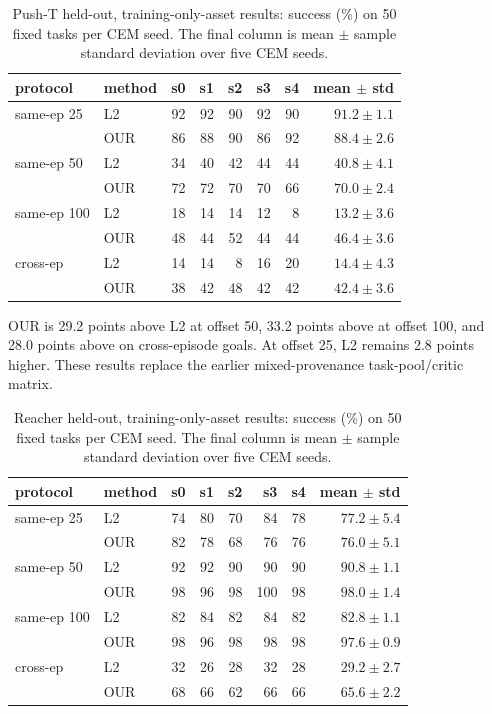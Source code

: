 \documentclass[11pt]{article}
\begin{document}
\begin{table}[t]
\centering
\small
\caption{Push-T held-out, training-only-asset results: success (\%) on 50 fixed tasks per
CEM seed.  The final column is mean $\pm$ sample standard deviation over five CEM seeds.}
\label{tab:task-critic-refresh}
\begin{tabular}{llrrrrrr}
\toprule
protocol & method & s0 & s1 & s2 & s3 & s4 & mean $\pm$ std \\
\midrule
same-ep 25 & L2 & 92 & 92 & 90 & 92 & 90 & $91.2 \pm 1.1$ \\
           & OUR & 86 & 88 & 90 & 86 & 92 & $88.4 \pm 2.6$ \\
\midrule
same-ep 50 & L2 & 34 & 40 & 42 & 44 & 44 & $40.8 \pm 4.1$ \\
           & OUR & 72 & 72 & 70 & 70 & 66 & $70.0 \pm 2.4$ \\
\midrule
same-ep 100 & L2 & 18 & 14 & 14 & 12 & 8 & $13.2 \pm 3.6$ \\
            & OUR & 48 & 44 & 52 & 44 & 44 & $46.4 \pm 3.6$ \\
\midrule
cross-ep & L2 & 14 & 14 & 8 & 16 & 20 & $14.4 \pm 4.3$ \\
         & OUR & 38 & 42 & 48 & 42 & 42 & $42.4 \pm 3.6$ \\
\bottomrule
\end{tabular}
\end{table}

OUR is 29.2 points above L2 at offset 50, 33.2 points above at offset 100, and 28.0 points
above on cross-episode goals.  At offset 25, L2 remains 2.8 points higher.  These results
replace the earlier mixed-provenance task-pool/critic matrix.

\begin{table}[t]
\centering
\small
\caption{Reacher held-out, training-only-asset results: success (\%) on 50 fixed tasks per
CEM seed. The final column is mean $\pm$ sample standard deviation over five CEM seeds.}
\label{tab:reacher-task-critic-refresh}
\begin{tabular}{llrrrrrr}
\toprule
protocol & method & s0 & s1 & s2 & s3 & s4 & mean $\pm$ std \\
\midrule
same-ep 25 & L2 & 74 & 80 & 70 & 84 & 78 & $77.2 \pm 5.4$ \\
           & OUR & 82 & 78 & 68 & 76 & 76 & $76.0 \pm 5.1$ \\
\midrule
same-ep 50 & L2 & 92 & 92 & 90 & 90 & 90 & $90.8 \pm 1.1$ \\
           & OUR & 98 & 96 & 98 & 100 & 98 & $98.0 \pm 1.4$ \\
\midrule
same-ep 100 & L2 & 82 & 84 & 82 & 84 & 82 & $82.8 \pm 1.1$ \\
            & OUR & 98 & 96 & 98 & 98 & 98 & $97.6 \pm 0.9$ \\
\midrule
cross-ep & L2 & 32 & 26 & 28 & 32 & 28 & $29.2 \pm 2.7$ \\
         & OUR & 68 & 66 & 62 & 66 & 66 & $65.6 \pm 2.2$ \\
\bottomrule
\end{tabular}
\end{table}
\end{document}
